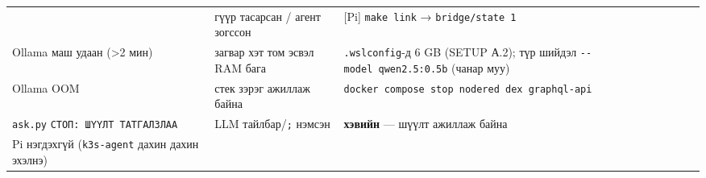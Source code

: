 \begin{longtable}[]{@{}lll@{}}
\begin{minipage}[t]{0.30\columnwidth}
\end{minipage} & \begin{minipage}[t]{0.30\columnwidth}\raggedright
гүүр тасарсан / агент зогссон\strut
\end{minipage} & \begin{minipage}[t]{0.30\columnwidth}\raggedright
{[}Pi{]} \texttt{make\ link} → \texttt{bridge/state\ 1}\strut
\end{minipage}\tabularnewline
\begin{minipage}[t]{0.30\columnwidth}\raggedright
Ollama маш удаан (\textgreater2 мин)\strut
\end{minipage} & \begin{minipage}[t]{0.30\columnwidth}\raggedright
загвар хэт том эсвэл RAM бага\strut
\end{minipage} & \begin{minipage}[t]{0.30\columnwidth}\raggedright
\texttt{.wslconfig}-д 6 GB (SETUP А.2); түр шийдэл \texttt{-\/\allowbreak{}-model\ qwen2.\allowbreak{}5:\allowbreak{}0.\allowbreak{}5b} (чанар муу)\strut
\end{minipage}\tabularnewline
\begin{minipage}[t]{0.30\columnwidth}\raggedright
Ollama OOM\strut
\end{minipage} & \begin{minipage}[t]{0.30\columnwidth}\raggedright
стек зэрэг ажиллаж байна\strut
\end{minipage} & \begin{minipage}[t]{0.30\columnwidth}\raggedright
\texttt{docker\ compose\ stop\ nodered\ dex\ graphql-api}\strut
\end{minipage}\tabularnewline
\begin{minipage}[t]{0.30\columnwidth}\raggedright
\texttt{ask.py} \texttt{СТОП:\allowbreak{}\ ШҮҮЛТ\ ТАТГАЛЗЛАА}\strut
\end{minipage} & \begin{minipage}[t]{0.30\columnwidth}\raggedright
LLM тайлбар/\texttt{;} нэмсэн\strut
\end{minipage} & \begin{minipage}[t]{0.30\columnwidth}\raggedright
\textbf{хэвийн} --- шүүлт ажиллаж байна\strut
\end{minipage}\tabularnewline
\begin{minipage}[t]{0.30\columnwidth}\raggedright
Pi нэгдэхгүй (\texttt{k3s-agent} дахин дахин эхэлнэ)\strut
\end{minipage} & \begin{minipage}[t]{0.30\columnwidth}\raggedright

\end{minipage}
\end{longtable}
